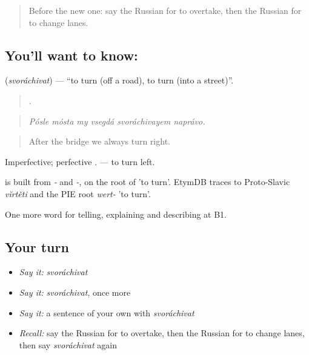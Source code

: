 \label{lesson:RU-C407-svorachivat}



\begin{quote}
Before the new one: say the Russian for to overtake, then the Russian for to change lanes.
\end{quote}

\subsection*{You'll want to know: }
\textbf{} (\emph{svoráchivat}) — \textquotedblleft{}to turn (off a road), to turn (into a street)\textquotedblright{}.

\begin{quote}
     .
\end{quote}

\begin{quote}
\emph{Pósle mósta my vsegdá svoráchivayem naprávo.}
\end{quote}

\begin{quote}
After the bridge we always turn right.
\end{quote}

Imperfective; perfective \emph{}. \emph{ } — to turn left.

\begin{cousinweb}
\emph{} is built from \emph{-} and \emph{-}, on the root of \emph{} 'to turn'. EtymDB traces \emph{} to Proto-Slavic \emph{vĭrtěti} and the PIE root \emph{wert-} 'to turn'.
\end{cousinweb}

\begin{grammarlens}[title={What you've built}]
One more word for telling, explaining and describing at B1.
\end{grammarlens}

\subsection*{Your turn}
\begin{itemize}
\raggedright
  \item \emph{Say it:} \emph{svoráchivat}
  \item \emph{Say it:} \emph{svoráchivat}, once more
  \item \emph{Say it:} a sentence of your own with \emph{svoráchivat}
  \item \emph{Recall:} say the Russian for to overtake, then the Russian for to change lanes, then say \emph{svoráchivat} again
\end{itemize}

